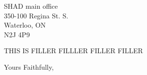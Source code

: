 \documentclass[]{letter}
\begin{document}
	\signature{INOFOPLUG}
	\address{Memorial University of Newfoundland \\ St. Johns,  NL\\A1B 3X9}
	\begin{letter}{SHAD main office \\ 350-100 Regina St. S. \\ Waterloo, ON \\ N2J 4P9}
		\opening{}
		
		THIS IS FILLER FILLLER FILLER FILLER
		
		\closing{Yours Faithfully,}
		
		
	\end{letter}
\end{document}
